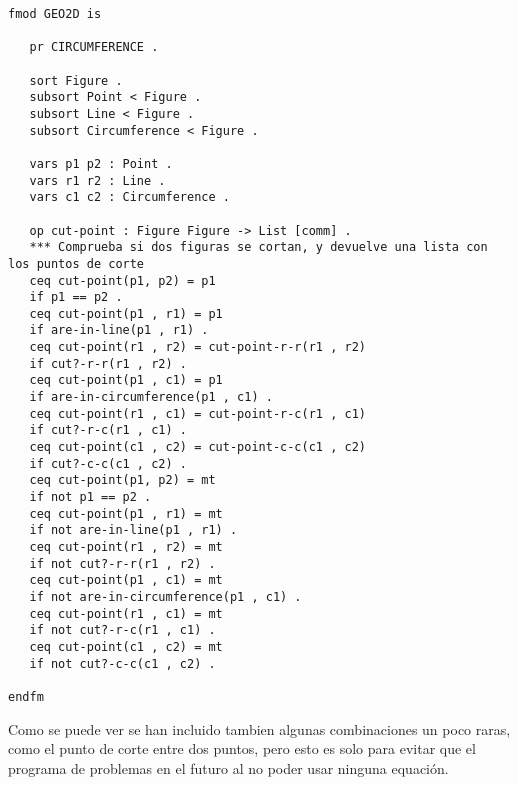 \documentclass[12pt,a4paper]{book}
\begin{document}
\begin{verbatim}
fmod GEO2D is

   pr CIRCUMFERENCE .

   sort Figure .
   subsort Point < Figure .
   subsort Line < Figure .
   subsort Circumference < Figure .

   vars p1 p2 : Point .
   vars r1 r2 : Line .
   vars c1 c2 : Circumference .

   op cut-point : Figure Figure -> List [comm] .
   *** Comprueba si dos figuras se cortan, y devuelve una lista con los puntos de corte
   ceq cut-point(p1, p2) = p1
   if p1 == p2 .
   ceq cut-point(p1 , r1) = p1
   if are-in-line(p1 , r1) .
   ceq cut-point(r1 , r2) = cut-point-r-r(r1 , r2)
   if cut?-r-r(r1 , r2) .
   ceq cut-point(p1 , c1) = p1
   if are-in-circumference(p1 , c1) .
   ceq cut-point(r1 , c1) = cut-point-r-c(r1 , c1)
   if cut?-r-c(r1 , c1) .
   ceq cut-point(c1 , c2) = cut-point-c-c(c1 , c2)
   if cut?-c-c(c1 , c2) .
   ceq cut-point(p1, p2) = mt
   if not p1 == p2 .	
   ceq cut-point(p1 , r1) = mt
   if not are-in-line(p1 , r1) .
   ceq cut-point(r1 , r2) = mt 
   if not cut?-r-r(r1 , r2) .
   ceq cut-point(p1 , c1) = mt
   if not are-in-circumference(p1 , c1) .
   ceq cut-point(r1 , c1) = mt
   if not cut?-r-c(r1 , c1) .
   ceq cut-point(c1 , c2) = mt
   if not cut?-c-c(c1 , c2) .

endfm	
\end{verbatim}

Como se puede ver se han incluido tambien algunas combinaciones un poco raras, como el punto de corte entre dos puntos, pero esto es solo para evitar que el programa de problemas en el futuro al no poder usar ninguna equaci\'on.
\end{document}
